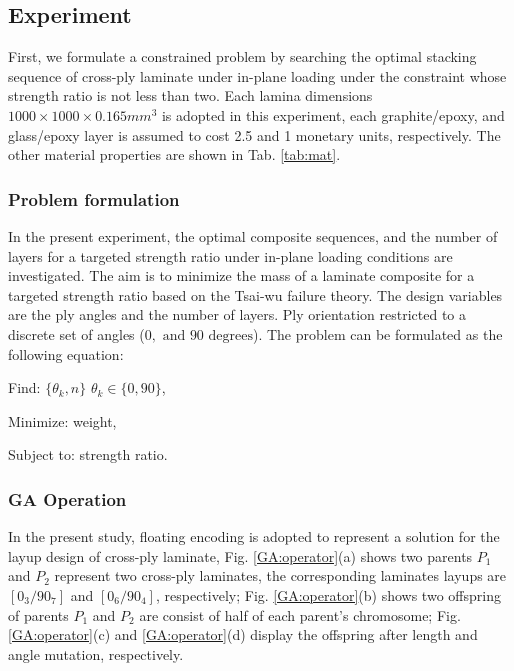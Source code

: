 \subsection{Experiment}
First, we formulate a constrained problem by searching the optimal stacking
sequence of cross-ply laminate under in-plane loading under the constraint
whose strength ratio is not less than two.  Each lamina dimensions $1000 \times
1000 \times 0.165 mm^3$ is adopted in this experiment, each graphite/epoxy,
and glass/epoxy layer is assumed to cost 2.5 and 1 monetary units,
respectively. The other material properties are shown in Tab. \ref{tab:mat}. 


\subsubsection{Problem formulation}

In the present experiment, the optimal composite sequences, and the number of
layers for a targeted strength ratio under in-plane loading conditions are
investigated.  The aim is to minimize the mass of a laminate composite for a
targeted strength ratio based on the Tsai-wu failure theory. The design
variables are the ply angles and the number of layers.  Ply orientation
restricted to a discrete set of angles ($0, \text{ and } 90 \text{ degrees} $).
The problem can be formulated as the following equation:

Find: $\{\theta_k, n\}$ $\theta_k \in \{ 0,90\}$,

Minimize: weight,

Subject to: strength ratio.


\subsubsection{GA Operation}


In the present study, floating encoding is adopted to represent a solution for
the layup design of cross-ply laminate, Fig. \ref{GA:operator}(a) shows two
parents $P_1$ and $P_2$ represent two cross-ply laminates, the
corresponding laminates layups are $[0_3/90_7]$ and $[0_6/90_4]$,
respectively; Fig. \ref{GA:operator}(b) shows two offspring of parents $P_1$
and $P_2$ are consist of half of each parent's chromosome; Fig. 
\ref{GA:operator}(c) and \ref{GA:operator}(d) display the offspring after
length and angle mutation, respectively.

